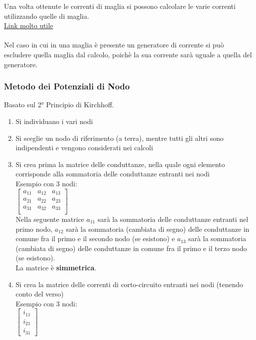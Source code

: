 \documentclass[../main.tex]{subfiles}
\begin{document}
	Una volta ottenute le correnti di maglia si possono calcolare le varie correnti utilizzando quelle di maglia.\\
	\href{https://www.youtube.com/watch?v=R8OTpGP6NKw}{Link molto utile}\\\\
	Nel caso in cui in una maglia è presente un generatore di corrente si può escludere quella maglia dal calcolo, poichè la sua corrente sarà uguale a quella del generatore.
	\subsubsection{Metodo dei Potenziali di Nodo}
	Basato sul 2° Principio di Kirchhoff.\\
	\begin{enumerate}
		\item Si individuano i vari nodi
		\item Si sceglie un nodo di riferimento (a terra), mentre tutti gli altri sono indipendenti e vengono considerati nei calcoli
		\item Si crea prima la matrice delle conduttanze, nella quale ogni elemento corrisponde alla sommatoria delle conduttanze entranti nei nodi\\
		Esempio con 3 nodi: \\
		$\begin{bmatrix}
			a_{11} & a_{12} & a_{13}\\
			a_{21} & a_{22} & a_{23}\\
			a_{31} & a_{32} & a_{33}\\
		\end{bmatrix}$\\
		Nella seguente matrice $a_{11}$ sarà la sommatoria delle conduttanze entranti nel primo nodo, $a_{12}$ sarà la sommatoria (cambiata di segno) delle conduttanze in comune fra il primo e il secondo nodo (se esistono) e $a_{13}$ sarà la sommatoria (cambiata di segno) delle conduttanze in comune fra il primo e il terzo nodo (se esistono).\\
		La matrice è \textbf{simmetrica}.
		\item Si crea la matrice delle correnti di corto-circuito entranti nei nodi (tenendo conto del verso)\\
		Esempio con 3 nodi:\\
		$\begin{bmatrix}
			i_{11} \\
			i_{21} \\
			i_{31}
		\end{bmatrix}$\\

\end{enumerate}
\end{document}
